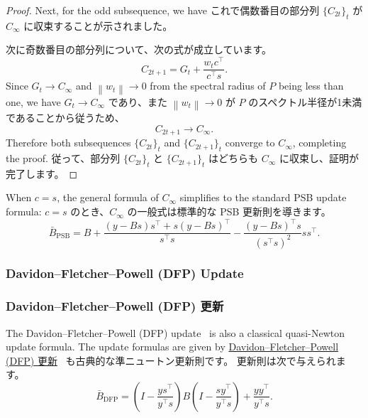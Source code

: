 \documentclass[0_main]{subfiles}
\begin{document}
\begin{proof}
        Next, for the odd subsequence, we have
    \else
        これで偶数番目の部分列 $\{ C_{2t} \}_t$ が $C_{\infty}$ に収束することが示されました。

        次に奇数番目の部分列について、次の式が成立しています。
    \fi
    \begin{equation*}
        C_{2t+1}
        =
        G_t+\frac{w_t c^\top}{c^\top s}.
    \end{equation*}
    \ifEn
        Since $G_t\to C_{\infty}$ and $\left\lVert w_t \right\rVert\to0$ from the spectral radius of $P$ being less than one, we have
    \else
        $G_t\to C_{\infty}$ であり、また $\left\lVert w_t \right\rVert\to0$ が $P$ のスペクトル半径が1未満であることから従うため、
    \fi
    \begin{equation*}
        C_{2t+1} \to C_{\infty}.
    \end{equation*}
    \ifEn
        Therefore both subsequences $\{ C_{2t} \}_t$ and $\{ C_{2t+1} \}_t$ converge to $C_{\infty}$, completing the proof.
    \else
        従って、部分列 $\{ C_{2t} \}_t$ と $\{ C_{2t+1} \}_t$ はどちらも $C_{\infty}$ に収束し、証明が完了します。
    \fi
    \myQED
\end{proof}

\ifEn
    When $c = s$, the general formula of $C_{\infty}$ simplifies to the standard PSB update formula:
\else
    $c = s$ のとき、$C_{\infty}$ の一般式は標準的な PSB 更新則を導きます。
\fi
\begin{equation*}
    \bar{B}_{\mathrm{PSB}} = B + \frac{(y - Bs)s^\top + s(y - Bs)^\top}{s^\top s} - \frac{(y - Bs)^\top s}{(s^\top s)^2} ss^\top.
\end{equation*}

\ifEn
    \subsubsection{Davidon--Fletcher--Powell (DFP) Update}
\else
    \subsubsection{Davidon--Fletcher--Powell (DFP) 更新}
\fi

\ifEn
    The Davidon--Fletcher--Powell (DFP) update~\citep{nocedal1999numerical} is also a classical quasi-Newton update formula. The update formulas are given by
\else
    \href{https://en.wikipedia.org/wiki/Davidon%E2%80%93Fletcher%E2%80%93Powell_formula}{Davidon--Fletcher--Powell (DFP) 更新}~\citep{nocedal1999numerical} も古典的な準ニュートン更新則です。
    更新則は次で与えられます。
\fi
\begin{equation*}
    \bar{B}_{\mathrm{DFP}} = \left(I - \frac{y s^\top}{y^\top s}\right) B \left(I - \frac{s y^\top}{y^\top s}\right) + \frac{y y^\top}{y^\top s}.
\end{equation*}
\end{document}
